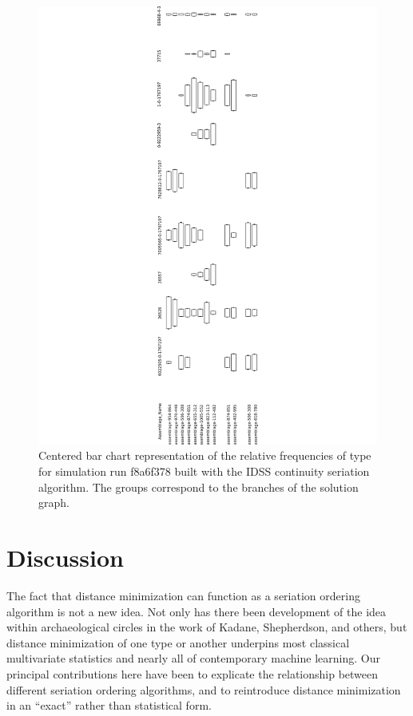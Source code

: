 \begin{figure}[ht]
\centering
\includegraphics[scale=0.5]{graphics/multipleseriation/continuity.pdf}
\caption{Centered bar chart representation of the relative frequencies of type for simulation run f8a6f378 built with the IDSS continuity seriation algorithm. The groups correspond to the branches of the solution graph.}
\label{multser:img:continuity}
\end{figure}


\section{Discussion}\label{multser:sec:discussion}

The fact that distance minimization can function as a seriation ordering
algorithm is not a new idea. Not only has there been development of the
idea within archaeological circles in the work of Kadane, Shepherdson,
and others, but distance minimization of one type or another underpins
most classical multivariate statistics and nearly all of contemporary
machine learning. Our principal contributions here have been to
explicate the relationship between different seriation ordering
algorithms, and to reintroduce distance minimization in an ``exact''
rather than statistical form.

